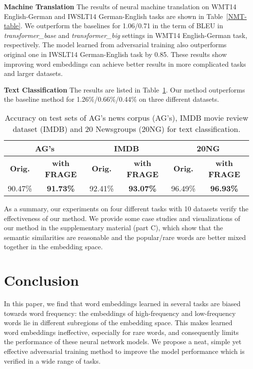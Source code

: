 \documentclass{article}
\begin{document}
\textbf{Machine Translation} The results of neural machine translation on WMT14 English-German and IWSLT14 German-English tasks are shown in Table~\ref{NMT-table}. We outperform the baselines for 1.06/0.71 in the term of BLEU in \emph{transformer\_base} and \emph{transformer\_big} settings in WMT14 English-German task, respectively. The model learned from adversarial training also outperforms original one in IWSLT14 German-English task by 0.85. These results show improving word embeddings can achieve better results in more complicated tasks and larger datasets.

\textbf{Text Classification} The results are listed in Table~\ref{Text-table}. Our method outperforms the baseline method for 1.26\%/0.66\%/0.44\% on three different datasets.


\begin{table}[!htbp]
\begin{center}
		\begin{tabular}{c|c||c|c||c|c}
			\toprule
			\multicolumn{2}{c||}{\bf AG's} & \multicolumn{2}{c||}{\bf IMDB} & \multicolumn{2}{c}{\bf 20NG} \\
            \hline
            \bf Orig. & \bf  with FRAGE & \bf Orig. & \bf  with FRAGE & \bf Orig. & \bf  with FRAGE\\
            \hline
            90.47\% & \bf 91.73\%  & 92.41\%  & \bf 93.07\% & 96.49\%\cite{lai2015recurrent} & \bf 96.93\%\\
            \bottomrule
		\end{tabular}
	\end{center}
	\caption{\label{Text-table} Accuracy on test sets of AG's news corpus (AG's), IMDB movie review dataset (IMDB) and 20 Newsgroups (20NG) for text classification.}
\end{table}

As a summary, our experiments on four different tasks with 10 datasets verify the effectiveness of our method. We provide some case studies and visualizations of our method in the supplementary material (part C), which show that the semantic similarities are reasonable and the popular/rare words are better mixed together in the embedding space.

\section{Conclusion}
In this paper, we find that word embeddings learned in several tasks are biased towards word frequency: the embeddings of high-frequency and low-frequency words lie in different subregions of the embedding space. This makes learned word embeddings ineffective, especially for rare words, and consequently limits the performance of these neural network models. We propose a neat, simple yet effective adversarial training method to improve the model performance which is verified in a wide range of tasks.
\end{document}
